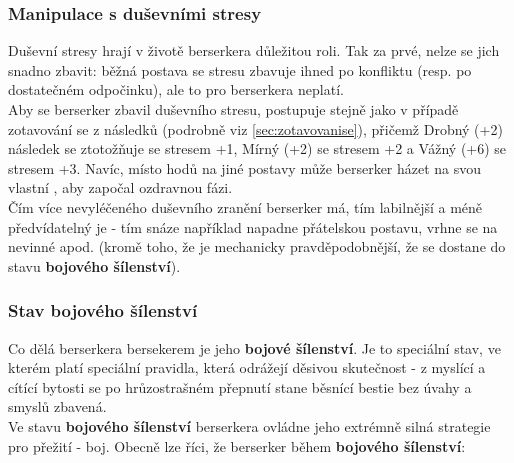 \subsubsection*{Manipulace s duševními stresy}
Duševní stresy hrají v životě berserkera důležitou roli. Tak za prvé, nelze se jich snadno zbavit: běžná postava se stresu zbavuje ihned po konfliktu (resp. po dostatečném odpočinku), ale to pro berserkera neplatí. \\
Aby se berserker zbavil duševního stresu, postupuje stejně jako v případě zotavování se z následků (podrobně viz \ref{sec:zotavovanise}), přičemž Drobný (+2) následek se ztotožňuje se stresem +1, Mírný (+2) se stresem +2 a Vážný (+6) se stresem +3. Navíc, místo hodů na  jiné postavy může berserker házet na svou vlastní , aby započal ozdravnou fázi.\\
Čím více nevyléčeného duševního zranění berserker má, tím labilnější a méně předvídatelný je - tím snáze například napadne přátelskou postavu, vrhne se na nevinné apod. (kromě toho, že je mechanicky pravděpodobnější, že se dostane do stavu \textbf{bojového šílenství}).

\subsubsection*{Stav bojového šílenství}
Co dělá berserkera bersekerem je jeho \textbf{bojové šílenství}. Je to speciální stav, ve kterém platí speciální pravidla, která odrážejí děsivou skutečnost - z myslící a cítící bytosti se po hrůzostrašném přepnutí stane běsnící bestie bez úvahy a smyslů zbavená. \\
Ve stavu \textbf{bojového šílenství} berserkera ovládne jeho extrémně silná strategie pro přežití - boj. Obecně lze říci, že berserker během \textbf{bojového šílenství}:

